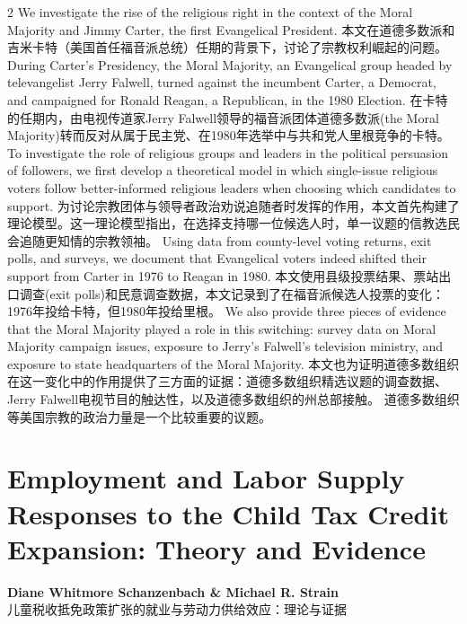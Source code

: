\documentclass[cn,hazy,blue,14pt,screen]{elegantnote}
\begin{document}
\begin{paracol}{2}
	We investigate the rise of the religious right in the context of the Moral Majority and Jimmy Carter, the first Evangelical President. 
	\switchcolumn
	本文在道德多数派和吉米卡特（美国首任福音派总统）任期的背景下，讨论了宗教权利崛起的问题。
	\switchcolumn*
	During Carter's Presidency, the Moral Majority, an Evangelical group headed by televangelist Jerry Falwell, turned against the incumbent Carter, a Democrat, and campaigned for Ronald Reagan, a Republican, in the 1980 Election. 
	\switchcolumn
	在卡特的任期内，由电视传道家Jerry Falwell领导的福音派团体道德多数派(the Moral Majority)转而反对从属于民主党、在1980年选举中与共和党人里根竞争的卡特。
	\switchcolumn*
	To investigate the role of religious groups and leaders in the political persuasion of followers, we first develop a theoretical model in which single-issue religious voters follow better-informed religious leaders when choosing which candidates to support. 
	\switchcolumn
	为讨论宗教团体与领导者政治劝说追随者时发挥的作用，本文首先构建了理论模型。这一理论模型指出，在选择支持哪一位候选人时，单一议题的信教选民会追随更知情的宗教领袖。
	\switchcolumn*
	Using data from county-level voting returns, exit polls, and surveys, we document that Evangelical voters indeed shifted their support from Carter in 1976 to Reagan in 1980. 
	\switchcolumn
	本文使用县级投票结果、票站出口调查(exit polls)和民意调查数据，本文记录到了在福音派候选人投票的变化：1976年投给卡特，但1980年投给里根。
	\switchcolumn*
	We also provide three pieces of evidence that the Moral Majority played a role in this switching: survey data on Moral Majority campaign issues, exposure to Jerry's Falwell's television ministry, and exposure to state headquarters of the Moral Majority.
	\switchcolumn
	本文也为证明道德多数组织在这一变化中的作用提供了三方面的证据：道德多数组织精选议题的调查数据、Jerry Falwell电视节目的触达性，以及道德多数组织的州总部接触。
	\switchcolumn*
	道德多数组织等美国宗教的政治力量是一个比较重要的议题。
\end{paracol}

\section{Employment and Labor Supply Responses to the Child Tax Credit Expansion: Theory and Evidence}
\begin{center}
	\textbf{Diane Whitmore Schanzenbach \& Michael R. Strain}\\
	儿童税收抵免政策扩张的就业与劳动力供给效应：理论与证据
\end{center}
\end{document}
